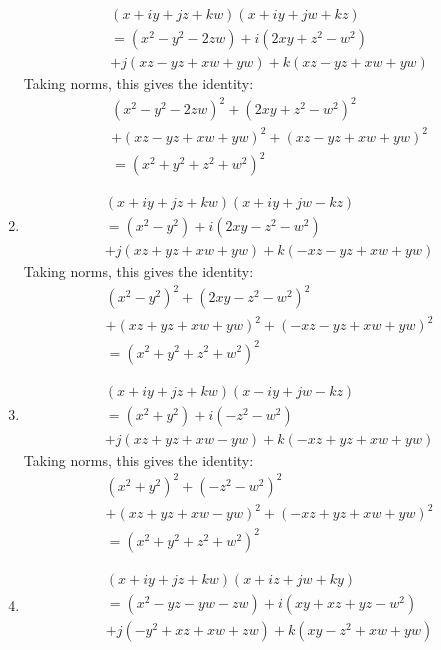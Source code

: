 \documentclass[12pt]{article}
\theoremstyle{definition}
\numberwithin{equation}{section}
\begin{document}
\begin{enumerate}[{Identity} I:]
    \begin{align*}
    &(x + iy + jz + kw)(x + iy + jw + kz) \\
    &= (x^2 - y^2 - 2zw ) + i(2xy + z^2 -w^2) \\
        &+ j(xz - yz + xw + yw) + k(xz - yz + xw + yw) 
    \end{align*}
Taking norms, this gives the identity:
    \begin{align*}
    &(x^2 - y^2 - 2zw )^2 + (2xy + z^2 - w^2)^2 \\
        &+ (xz - yz + xw + yw)^2 + (xz - yz + xw + yw)^2 \\
    &= (x^2 + y^2 + z^2 + w^2)^2
    \end{align*}
\item
    \begin{align*}
    &(x + iy + jz + kw)(x + iy + jw - kz) \\
    &= (x^2 - y^2 ) + i(2xy - z^2 - w^2) \\
        &+ j(xz + yz + xw + yw) + k(-xz - yz + xw + yw) 
    \end{align*}
Taking norms, this gives the identity:
    \begin{align*}
    &(x^2 - y^2 )^2 + (2xy - z^2 - w^2)^2 \\
        &+ (xz + yz + xw + yw)^2 + (-xz - yz + xw + yw)^2 \\ 
    &= (x^2 + y^2 + z^2 + w^2)^2
    \end{align*}
\item
    \begin{align*}
    &(x + iy + jz + kw)(x - iy + jw - kz) \\
    &= (x^2 + y^2 ) + i(- z^2 - w^2) \\
        &+ j(xz + yz + xw - yw) + k(-xz + yz + xw + yw) 
    \end{align*}
Taking norms, this gives the identity:
    \begin{align*}
    &(x^2 + y^2 )^2 + (- z^2 - w^2)^2 \\
        &+ (xz + yz + xw - yw)^2 + (-xz + yz + xw + yw)^2 \\
    &= (x^2 + y^2 + z^2 + w^2)^2
    \end{align*}
\item
    \begin{align*}
    &(x + iy + jz + kw)(x + iz + jw + ky) \\
    &= (x^2 - yz - yw - zw ) + i(xy + xz + yz - w^2) \\
        &+ j(-y^2 + xz + xw + zw) + k(xy - z^2 + xw + yw) 
    \end{align*}

\end{enumerate}
\end{document}
